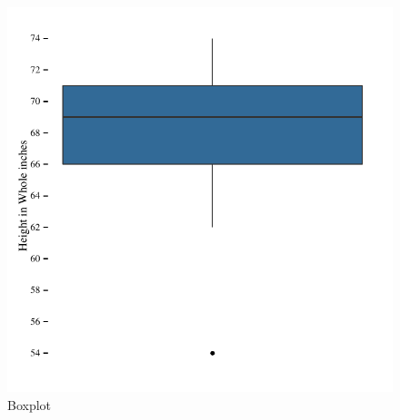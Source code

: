 \documentclass[nohyper,justified]{tufte-handout}\usepackage[]{graphicx}\usepackage[]{color}
\makeatletter
\def\maxwidth{ %
  \ifdim\Gin@nat@width>\linewidth
    \linewidth
  \else
    \Gin@nat@width
  \fi
}
\newenvironment{knitrout}{}{} %
\makeatother
\begin{document}
\begin{knitrout}
\color{fgcolor}\begin{figure}

{\centering \includegraphics[width=\maxwidth]{figure/graphics-boxplot-1} 

}

\caption[Boxplot]{Boxplot}\label{fig:boxplot}
\end{figure}


\end{knitrout}
\end{document}
